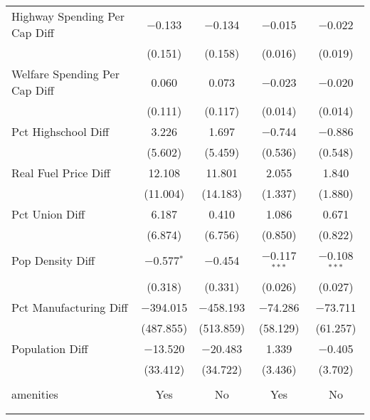 \begin{table}[!htbp]
\begin{tabular}{@{\extracolsep{5pt}}lcccc}
  Highway Spending Per Cap Diff & $-$0.133 & $-$0.134 & $-$0.015 & $-$0.022 \\ 
  & (0.151) & (0.158) & (0.016) & (0.019) \\ 
  Welfare Spending Per Cap Diff & 0.060 & 0.073 & $-$0.023 & $-$0.020 \\ 
  & (0.111) & (0.117) & (0.014) & (0.014) \\ 
  Pct Highschool Diff & 3.226 & 1.697 & $-$0.744 & $-$0.886 \\ 
  & (5.602) & (5.459) & (0.536) & (0.548) \\ 
  Real Fuel Price Diff & 12.108 & 11.801 & 2.055 & 1.840 \\ 
  & (11.004) & (14.183) & (1.337) & (1.880) \\ 
  Pct Union Diff & 6.187 & 0.410 & 1.086 & 0.671 \\ 
  & (6.874) & (6.756) & (0.850) & (0.822) \\ 
  Pop Density Diff & $-$0.577$^{*}$ & $-$0.454 & $-$0.117$^{***}$ & $-$0.108$^{***}$ \\ 
  & (0.318) & (0.331) & (0.026) & (0.027) \\ 
  Pct Manufacturing Diff & $-$394.015 & $-$458.193 & $-$74.286 & $-$73.711 \\ 
  & (487.855) & (513.859) & (58.129) & (61.257) \\ 
  Population Diff & $-$13.520 & $-$20.483 & 1.339 & $-$0.405 \\ 
  & (33.412) & (34.722) & (3.436) & (3.702) \\ 
 \hline \\[-1.8ex] 
amenities & Yes & No & Yes & No \\ 
\hline \\[-1.8ex] 
\hline 
\hline \\[-1.8ex] 
\end{tabular} 
\end{table} 
